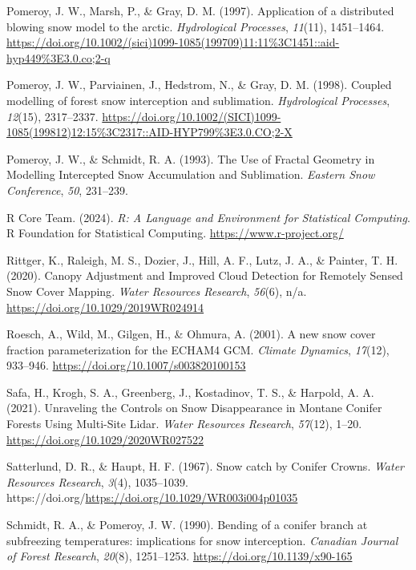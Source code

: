 \documentclass[
  letterpaper,
  DIV=11,
  numbers=noendperiod]{scrartcl}
\newlength{\cslhangindent}
\newenvironment{CSLReferences}[2] %
 {\begin{list}{}{%
  \setlength{\itemindent}{0pt}
  \setlength{\leftmargin}{0pt}
  \setlength{\parsep}{0pt}
  \ifodd #1
   \setlength{\leftmargin}{\cslhangindent}
   \setlength{\itemindent}{-1\cslhangindent}
  \fi
  \setlength{\itemsep}{#2\baselineskip}}}
 {\end{list}}
\begin{document}
\begin{CSLReferences}{1}{0}
Pomeroy, J. W., Marsh, P., \& Gray, D. M. (1997). {Application of a
distributed blowing snow model to the arctic}. \emph{Hydrological
Processes}, \emph{11}(11), 1451--1464.
\url{https://doi.org/10.1002/(sici)1099-1085(199709)11:11\%3C1451::aid-hyp449\%3E3.0.co;2-q}

Pomeroy, J. W., Parviainen, J., Hedstrom, N., \& Gray, D. M. (1998).
{Coupled modelling of forest snow interception and sublimation}.
\emph{Hydrological Processes}, \emph{12}(15), 2317--2337.
\url{https://doi.org/10.1002/(SICI)1099-1085(199812)12:15\%3C2317::AID-HYP799\%3E3.0.CO;2-X}

Pomeroy, J. W., \& Schmidt, R. A. (1993). {The Use of Fractal Geometry
in Modelling Intercepted Snow Accumulation and Sublimation}.
\emph{Eastern Snow Conference}, \emph{50}, 231--239.

R Core Team. (2024). \emph{{R: A Language and Environment for
Statistical Computing}}. R Foundation for Statistical Computing.
\url{https://www.r-project.org/}

Rittger, K., Raleigh, M. S., Dozier, J., Hill, A. F., Lutz, J. A., \&
Painter, T. H. (2020). {Canopy Adjustment and Improved Cloud Detection
for Remotely Sensed Snow Cover Mapping}. \emph{Water Resources
Research}, \emph{56}(6), n/a. \url{https://doi.org/10.1029/2019WR024914}

Roesch, A., Wild, M., Gilgen, H., \& Ohmura, A. (2001). {A new snow
cover fraction parameterization for the ECHAM4 GCM}. \emph{Climate
Dynamics}, \emph{17}(12), 933--946.
\url{https://doi.org/10.1007/s003820100153}

Safa, H., Krogh, S. A., Greenberg, J., Kostadinov, T. S., \& Harpold, A.
A. (2021). {Unraveling the Controls on Snow Disappearance in Montane
Conifer Forests Using Multi-Site Lidar}. \emph{Water Resources
Research}, \emph{57}(12), 1--20.
\url{https://doi.org/10.1029/2020WR027522}

Satterlund, D. R., \& Haupt, H. F. (1967). {Snow catch by Conifer
Crowns}. \emph{Water Resources Research}, \emph{3}(4), 1035--1039.
https://doi.org/\url{https://doi.org/10.1029/WR003i004p01035}

Schmidt, R. A., \& Pomeroy, J. W. (1990). {Bending of a conifer branch
at subfreezing temperatures: implications for snow interception}.
\emph{Canadian Journal of Forest Research}, \emph{20}(8), 1251--1253.
\url{https://doi.org/10.1139/x90-165}


\end{CSLReferences}
\end{document}
